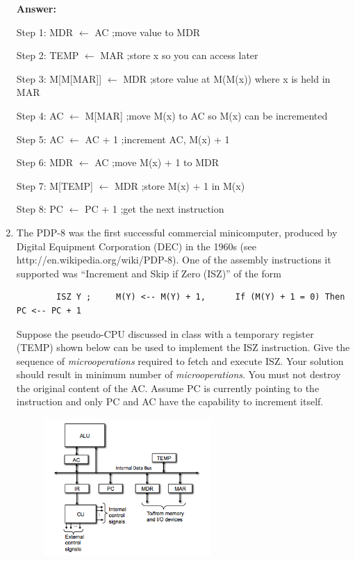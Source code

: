 \documentclass[12pt,letterpaper]{article}
\begin{document}
\begin{enumerate}
	\textbf{Answer:}
	
	Step 1: MDR $ \leftarrow$ AC 				\hfill ;move value to MDR	
	
	Step 2: TEMP $ \leftarrow$ MAR 	         \hfill ;store x so you can access later
	
	Step 3: M[M[MAR]] $ \leftarrow$ MDR  \hfill ;store value at M(M(x)) where x is held in MAR
	
	Step 4: AC $ \leftarrow$ M[MAR]		      \hfill  ;move M(x) to AC so M(x) can be incremented 
	
	Step 5: AC $ \leftarrow$ AC + 1 	       \hfill ;increment AC, M(x) + 1
	
	Step 6: MDR $ \leftarrow$ AC			   \hfill ;move M(x) + 1 to MDR
	
	Step 7: M[TEMP] $ \leftarrow$ MDR 	   \hfill ;store M(x) + 1  in M(x)
	
	Step 8: PC $ \leftarrow$ PC + 1				\hfill ;get the next instruction
	




	\clearpage
	\item
	The PDP-8 was the first successful commercial minicomputer, produced by Digital Equipment Corporation
	(DEC) in the 1960s (see http://en.wikipedia.org/wiki/PDP-8). 
	One of the assembly instructions it supported was “Increment and Skip if Zero (ISZ)” of the form
	\begin{verbatim}
		ISZ Y ;		M(Y) <-- M(Y) + 1, 		If (M(Y) + 1 = 0) Then PC <-- PC + 1 
	\end{verbatim}
	Suppose the pseudo-CPU discussed in class with a temporary register (TEMP) shown below can be used to
	implement the ISZ instruction. 
	Give the sequence of \textit{microoperations} required to fetch and execute ISZ. 
	Your solution should result in minimum number of \textit{microoperations}. 
	You must not destroy the original content of the AC. 
	Assume PC is currently pointing to the instruction and only PC and AC have the capability to increment itself. 
	\begin{figure}[h]
		\centering
		\includegraphics[width=0.6\textwidth]{Q3.png}
	\end{figure}
	

\end{enumerate}
\end{document}
